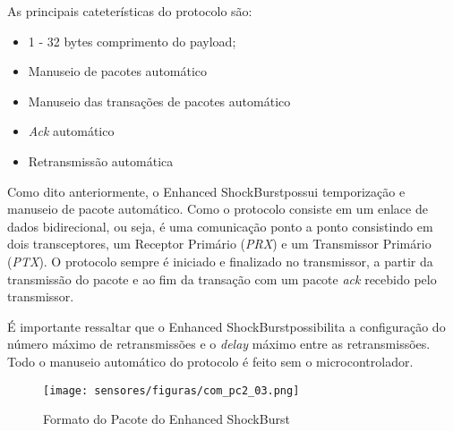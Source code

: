 
As principais cateterísticas do protocolo são:
\begin{itemize}
\item 1 - 32 bytes comprimento do payload;
\item Manuseio de pacotes automático
\item Manuseio das transações de pacotes automático
	\item \emph{Ack} automático
	\item Retransmissão automática
\end{itemize}

Como dito anteriormente, o Enhanced ShockBurst\texttrademark possui temporização e manuseio de pacote automático. Como o protocolo consiste em um enlace de dados bidirecional, ou seja, é uma comunicação ponto a ponto consistindo em dois transceptores, um Receptor Primário (\emph{PRX}) e um Transmissor Primário (\emph{PTX}). O protocolo sempre é iniciado e finalizado no transmissor, a partir da transmissão do pacote e ao fim da transação com um pacote \emph{ack} recebido pelo transmissor. 

É importante ressaltar que o Enhanced ShockBurst\texttrademark possibilita a configuração do número máximo de retransmissões e o \emph{delay} máximo entre as retransmissões. Todo o manuseio automático do protocolo é feito sem o microcontrolador. 


\begin{figure}[H]
\centering
	\label{com_pc2_03}
	\texttt{[image: sensores/figuras/com\_pc2\_03.png]}
   \caption{Formato do Pacote do Enhanced ShockBurst\texttrademark}
\end{figure}


